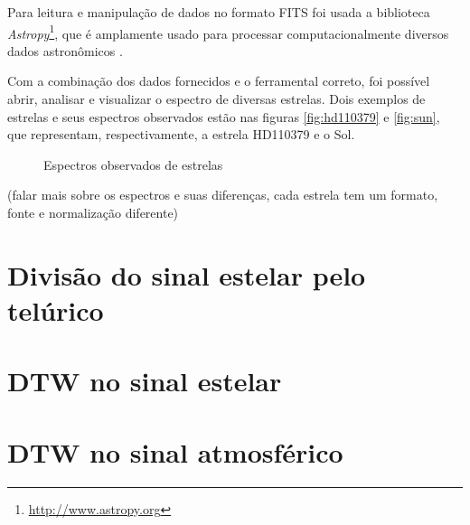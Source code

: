 Para leitura e manipulação de dados no formato FITS foi usada a biblioteca \textit{Astropy}\footnote{\url{http://www.astropy.org}}, que é amplamente usado para processar computacionalmente diversos dados astronômicos \citep{astropy:2018}. 

Com a combinação dos dados fornecidos e o ferramental correto, foi possível abrir, analisar e visualizar o espectro de diversas estrelas. Dois exemplos de estrelas e seus espectros observados estão nas figuras \ref{fig:hd110379} e \ref{fig:sun}, que representam, respectivamente, a estrela HD110379 e o Sol. 

\begin{figure}[!tbp]
  \centering
  \hfill
  \caption{Espectros observados de estrelas}
  \label{fig:two-stars}
\end{figure}

(falar mais sobre os espectros e suas diferenças, cada estrela tem um formato, fonte e normalização diferente)

\section{Divisão do sinal estelar pelo telúrico}

\section{DTW no sinal estelar}

\section{DTW no sinal atmosférico}